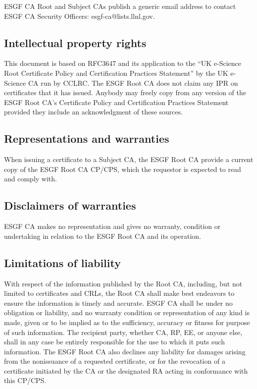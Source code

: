 ESGF CA Root and Subject CAs publish a generic email address to contact
ESGF CA Security Officers: esgf-ca@lists.llnl.gov.

\subsection{Intellectual property rights}\label{intellectual-property-rights}

This document is based on RFC3647 and its application to the ``UK
e-Science Root Certificate Policy and Certification Practices
Statement'' by the UK e-Science CA run by CCLRC. The ESGF Root CA does not claim any IPR on certificates that it has issued. Anybody may
freely copy from any version of the ESGF Root CA's Certificate
Policy and Certification Practices Statement provided they include an
acknowledgment of these sources.

\subsection{Representations and warranties}\label{representations-and-warranties}

When issuing a certificate to a Subject CA, the ESGF Root CA provide a current copy of the ESGF Root CA CP/CPS, which the requestor is expected to read and comply with.

\subsection{Disclaimers of warranties}\label{disclaimers-of-warranties}

ESGF CA makes no representation and gives no warranty, condition or
undertaking in relation to the ESGF Root CA and its operation.

\subsection{Limitations of liability}\label{limitations-of-liability}

With respect of the information published by the Root CA, including, but
not limited to certificates and CRLs, the Root CA shall make best
endeavors to ensure the information is timely and accurate. ESGF CA
shall be under no obligation or liability, and no warranty condition or
representation of any kind is made, given or to be implied as to the
sufficiency, accuracy or fitness for purpose of such information. The
recipient party, whether CA, RP, EE, or anyone else, shall in any case
be entirely responsible for the use to which it puts such information.
The ESGF Root CA also declines any liability for damages arising
from the nonissuance of a requested certificate, or for the revocation
of a certificate initiated by the CA or the designated RA acting in
conformance with this CP/CPS.

